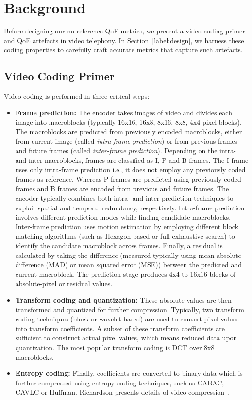 \section{Background} \label{label:background}

Before designing our no-reference QoE metrics, we present a video coding primer and QoE artefacts in video telephony.
In Section~\ref{label:design}, we harness these coding properties to carefully craft accurate metrics that capture such artefacts.

\subsection{Video Coding Primer}
Video coding is performed in three critical steps: 

\begin{itemize}[leftmargin=*]
\item \textbf{Frame prediction:}
    The encoder takes images of video and divides each image into macroblocks (typically 16x16, 16x8, 8x16, 8x8, 4x4 pixel blocks). The macroblocks are predicted from previously encoded macroblocks, either from current image (called \emph{intra-frame prediction}) or from previous frames and future frames (called \emph{inter-frame prediction}). Depending on the intra- and inter-macroblocks, frames are classified as I, P and B frames. The I frame uses only intra-frame prediction i.e., it does not employ any previously coded frames as reference. Whereas P frames are predicted using previously coded frames and B frames are encoded from previous and future frames. The encoder typically combines both intra- and inter-prediction techniques to exploit spatial and temporal redundancy, respectively. Intra-frame prediction involves different prediction modes \cite{richardson2004h} while finding candidate macroblocks. Inter-frame prediction uses motion estimation by employing different block matching algorithms (such as Hexagon based or full exhaustive search) to identify the candidate macroblock across frames. Finally, a residual is calculated by taking the difference (measured typically using mean absolute difference (MAD) or mean squared error (MSE)) between the predicted and current macroblock. The prediction stage produces 4x4 to 16x16 blocks of absolute-pixel or residual values. 

\item \textbf{Transform coding and quantization:}
These absolute values are then transformed and quantized for further compression. Typically, two transform coding techniques (block or wavelet based) are used to convert pixel values into transform coefficients. A subset of these transform coefficients are sufficient to construct actual pixel values, which means reduced data upon quantization. The most popular transform coding is DCT over 8x8 macroblocks. 

\item \textbf{Entropy coding:}
Finally, coefficients are converted to binary data which is further compressed using entropy coding techniques, such as CABAC, CAVLC or Huffman. Richardson presents details of video compression~\cite{richardson2004h}.
\end{itemize}
